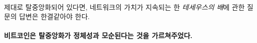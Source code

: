 \paragraph{}
제대로 탈중앙화되어 있다면, 네트워크의 가치가 지속되는 한 \textit{테세우스의 배}에 관한 질문의 답변은 한결같아야 한다.

\paragraph{비트코인은 탈중앙화가 정체성과 모순된다는 것을 가르쳐주었다.}

%
%
%
%
